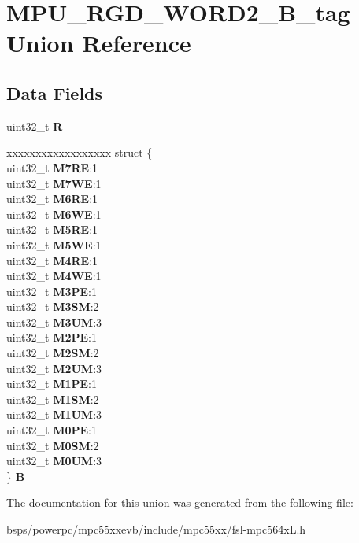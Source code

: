 \hypertarget{unionMPU__RGD__WORD2__32B__tag}{}\section{M\+P\+U\+\_\+\+R\+G\+D\+\_\+\+W\+O\+R\+D2\+\_\+B\+\_\+tag Union Reference}
\label{unionMPU__RGD__WORD2__32B__tag}
\subsection*{Data Fields}
\begin{DoxyCompactItemize}
\item 
\mbox{\label{unionMPU__RGD__WORD2__32B__tag_a1bdc1fba6b6ff01215874324331c86b3}} 
uint32\+\_\+t {\bfseries R}
\item 
\mbox{\label{unionMPU__RGD__WORD2__32B__tag_a216cbfa6e86ae61b2d6268c9d0fc8035}} 
\begin{tabbing}
xx\=xx\=xx\=xx\=xx\=xx\=xx\=xx\=xx\=\kill
struct \{\\
\>uint32\_t {\bfseries M7RE}:1\\
\>uint32\_t {\bfseries M7WE}:1\\
\>uint32\_t {\bfseries M6RE}:1\\
\>uint32\_t {\bfseries M6WE}:1\\
\>uint32\_t {\bfseries M5RE}:1\\
\>uint32\_t {\bfseries M5WE}:1\\
\>uint32\_t {\bfseries M4RE}:1\\
\>uint32\_t {\bfseries M4WE}:1\\
\>uint32\_t {\bfseries M3PE}:1\\
\>uint32\_t {\bfseries M3SM}:2\\
\>uint32\_t {\bfseries M3UM}:3\\
\>uint32\_t {\bfseries M2PE}:1\\
\>uint32\_t {\bfseries M2SM}:2\\
\>uint32\_t {\bfseries M2UM}:3\\
\>uint32\_t {\bfseries M1PE}:1\\
\>uint32\_t {\bfseries M1SM}:2\\
\>uint32\_t {\bfseries M1UM}:3\\
\>uint32\_t {\bfseries M0PE}:1\\
\>uint32\_t {\bfseries M0SM}:2\\
\>uint32\_t {\bfseries M0UM}:3\\
\} {\bfseries B}\\

\end{tabbing}\end{DoxyCompactItemize}


The documentation for this union was generated from the following file\+:\begin{DoxyCompactItemize}
\item 
bsps/powerpc/mpc55xxevb/include/mpc55xx/fsl-\/mpc564x\+L.\+h\end{DoxyCompactItemize}
